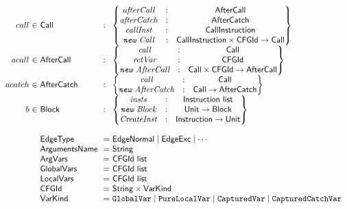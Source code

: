\[\begin{array}{r@{~}l@{~}l@{}l@{~}l}
call & \in & \SF{Call} & : &
\begin{Bmatrix}
\emph{afterCall} & : & \SF{AfterCall}\\
\emph{afterCatch} & : & \SF{AfterCatch}\\
\emph{callInst} & : & \SF{CallInstruction}\\
\emph{\TT{new}\ Call} & : & \SF{CallInstruction} \times \SF{CFGId}  \rightarrow \SF{Call} \\
\end{Bmatrix}\\

acall & \in & \SF{AfterCall} & : &
\begin{Bmatrix}
\emph{call} & : & \SF{Call}\\
\emph{retVar} & : & \SF{CFGId}\\
\emph{\TT{new}\ AfterCall} & : & \SF{Call} \times \SF{CFGId} \rightarrow \SF{AfterCall} \\
\end{Bmatrix}\\

acatch & \in & \SF{AfterCatch} & : &
\begin{Bmatrix}
\emph{call} & : & \SF{Call}\\
\emph{\TT{new}\ AfterCatch} & : & \SF{Call} \rightarrow \SF{AfterCatch} \\
\end{Bmatrix}\\

b & \in & \SF{Block} & : &
\begin{Bmatrix}
\emph{insts} & : & \SF{Instruction list}\\
\emph{\TT{new}\ Block} & : & \SF{Unit} \rightarrow \SF{Block} \\
\emph{CreateInst} & : & \SF{Instruction} \rightarrow \SF{Unit} \\
\end{Bmatrix}\\
&&\\

&&\SF{EdgeType} & = & \SF{EdgeNormal} \mid \SF{EdgeExc} \mid \cdots\\
&&\SF{ArgumentsName}\ \ & = & \SF{String}\\
&&\SF{ArgVars} & = & \SF{CFGId list}\\
&&\SF{GlobalVars} & = & \SF{CFGId list}\\
&&\SF{LocalVars} & = & \SF{CFGId list}\\
&&\SF{CFGId} & = & \SF{String} \times \SF{VarKind}\\
&&\SF{VarKind} & = & \TT{GlobalVar} \mid \TT{PureLocalVar} \mid \TT{CapturedVar} \mid \TT{CapturedCatchVar}\\
\end{array}
\]

